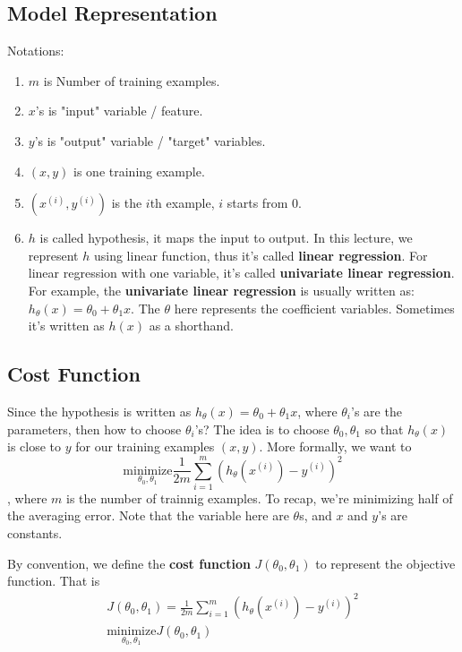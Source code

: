 \documentclass[11pt]{article}
\begin{document}
\subsection*{Model Representation}
\label{sec-3-1}
Notations:
\begin{enumerate}
\item \(m\) is Number of training examples.
\item \(x\)'s is "input" variable  / feature.
\item \(y\)'s is "output" variable / "target" variables.
\item \((x,y)\) is one training example.
\item \((x^{(i)},y^{(i)})\) is the \(i\)th example, \(i\) starts from \(0\).
\item \(h\) is called hypothesis, it maps the input to output. In this lecture, we represent \(h\) using linear function, thus it's called \textbf{linear regression}. For linear regression with one variable, it's called \textbf{univariate linear regression}. For example, the \textbf{univariate linear regression} is usually written as: \(h_\theta (x) = \theta_0 + \theta_1 x\). The \(\theta\) here represents the coefficient variables. Sometimes it's written as \(h(x)\) as a shorthand.
\end{enumerate}
\subsection*{Cost Function}
\label{sec-3-2}
Since the hypothesis is written as \(h_\theta (x) = \theta_0 + \theta_1 x\), where \(\theta_i\)'s are the parameters, then how to choose \(\theta_i\)'s?
The idea is to choose \(\theta_0, \theta_1\) so that \(h_\theta (x)\) is close to \(y\) for our training examples \((x,y)\). More formally, we want to
\[
\underset{\theta_0,\theta_1}{\text{minimize}} \frac{1}{2m}\sum_{i=1}^{m}\left( h_\theta(x^{(i)}) - y^{(i)} \right)^2
\],
where \(m\) is the number of trainnig examples. To recap, we're minimizing half of the averaging error. Note that the variable here are \(\theta\)s, and \(x\) and \(y\)'s are constants.

By convention, we define the \textbf{cost function} \(J(\theta_0,\theta_1)\) to represent the objective function. That is
\begin{gather*}
J(\theta_0,\theta_1) = \frac{1}{2m}\sum_{i=1}^{m}\left( h_\theta(x^{(i)}) - y^{(i)} \right)^2 \\
\underset{\theta_0,\theta_1}{\text{minimize}} J(\theta_0,\theta_1)
\end{gather*}
\end{document}
